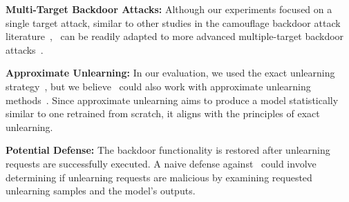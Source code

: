 \noindent \textbf{Multi-Target Backdoor Attacks:}
Although our experiments focused on a single target attack, similar to other studies in the camouflage backdoor attack literature~\cite{DBLP:conf/nips/DiDA0S23,DBLP:conf/aaai/LiuWHM24,uba}, \methodname~can be readily adapted to more advanced multiple-target backdoor attacks~\cite{DBLP:journals/tdsc/XueHWL22}.

 \vspace{0.15cm}
\noindent \textbf{Approximate Unlearning:}
In our evaluation, we used the exact unlearning strategy~\cite{sisa}, but we believe \methodname~could also work with approximate unlearning methods~\cite{adaptive,amnesiac,unrollsgd,mcu,ermktp}. Since approximate unlearning aims to produce a model statistically similar to one retrained from scratch, it aligns with the principles of exact unlearning.

 \vspace{0.15cm}
\noindent \textbf{Potential Defense:}
The backdoor functionality is restored after unlearning requests are successfully executed. A naive defense against \methodname~could involve determining if unlearning requests are malicious by examining requested unlearning samples and the model's outputs.